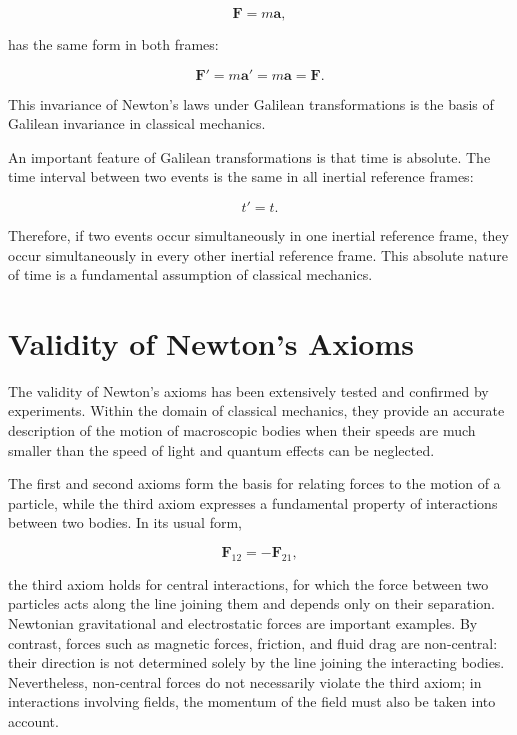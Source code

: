 \documentclass[12pt]{article}
\begin{document}
\begin{equation}
\mathbf{F} = m\mathbf{a},
\end{equation}

has the same form in both frames:

\begin{equation}
\mathbf{F}' = m\mathbf{a}' = m\mathbf{a} = \mathbf{F}.
\end{equation}

This invariance of Newton's laws under Galilean transformations is the basis of Galilean invariance in classical mechanics.

An important feature of Galilean transformations is that time is absolute. The time interval between two events is the same in all inertial reference frames:

\begin{equation}
t' = t.
\end{equation}

Therefore, if two events occur simultaneously in one inertial reference frame, they occur simultaneously in every other inertial reference frame. This absolute nature of time is a fundamental assumption of classical mechanics.

\section{Validity of Newton's Axioms}

The validity of Newton's axioms has been extensively tested and confirmed by experiments. Within the domain of classical mechanics, they provide an accurate description of the motion of macroscopic bodies when their speeds are much smaller than the speed of light and quantum effects can be neglected.

The first and second axioms form the basis for relating forces to the motion of a particle, while the third axiom expresses a fundamental property of interactions between two bodies. In its usual form,

$$
\mathbf{F}_{12}=-\mathbf{F}_{21},
$$

the third axiom holds for central interactions, for which the force between two particles acts along the line joining them and depends only on their separation. Newtonian gravitational and electrostatic forces are important examples. By contrast, forces such as magnetic forces, friction, and fluid drag are non-central: their direction is not determined solely by the line joining the interacting bodies. Nevertheless, non-central forces do not necessarily violate the third axiom; in interactions involving fields, the momentum of the field must also be taken into account.
\end{document}
